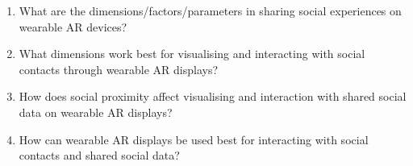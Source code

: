 \begin{enumerate}[label=RQ\arabic*]
    \item{\label{rq:continuum}
    What are the dimensions/factors/parameters in sharing social experiences on wearable AR devices?
    }
    \item{\label{rq:people}
    What dimensions work best for visualising and interacting with social contacts through wearable AR displays?
    }
    \item{\label{rq:data}
    How does social proximity affect visualising and interaction with shared social data on wearable AR displays?
    }
    \item{\label{rq:interaction}
    How can wearable AR displays be used best for interacting with social contacts and shared social data?
    }
\end{enumerate}

